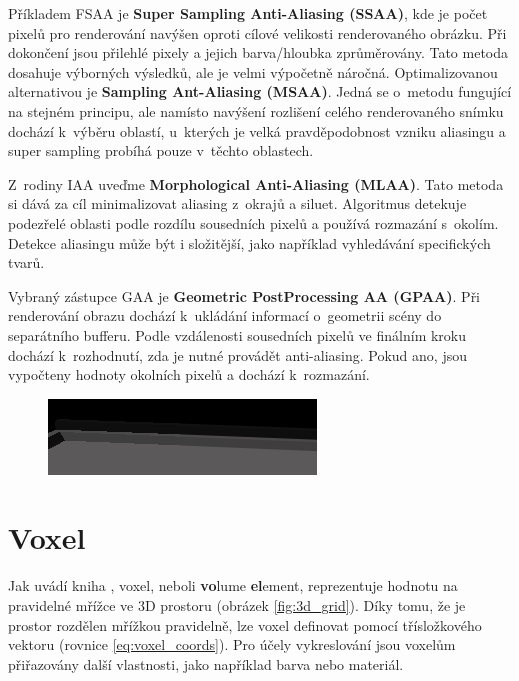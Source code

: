 Příkladem FSAA je \textbf{Super Sampling Anti-Aliasing (SSAA)}, kde je počet pixelů pro renderování navýšen oproti cílové velikosti renderovaného obrázku. Při dokončení jsou přilehlé pixely a jejich barva/hloubka zprůměrovány. Tato metoda dosahuje výborných výsledků, ale je velmi výpočetně náročná. Optimalizovanou alternativou je \textbf{Sampling Ant-Aliasing (MSAA)}. Jedná se o~metodu fungující na stejném principu, ale namísto navýšení rozlišení celého renderovaného snímku dochází k~výběru oblastí, u~kterých je velká pravděpodobnost vzniku aliasingu a super sampling probíhá pouze v~těchto oblastech.

Z~rodiny IAA uveďme\textbf{ Morphological Anti-Aliasing (MLAA)}. Tato metoda si dává za cíl minimalizovat aliasing z~okrajů a siluet. Algoritmus detekuje podezřelé oblasti podle rozdílu sousedních pixelů a používá rozmazání s~okolím. Detekce aliasingu může být i složitější, jako například vyhledávání specifických tvarů.


Vybraný zástupce GAA je \textbf{Geometric PostProcessing AA (GPAA)}. Při renderování obrazu dochází k~ukládání informací o~geometrii scény do separátního bufferu. Podle vzdálenosti sousedních pixelů ve finálním kroku dochází k~rozhodnutí, zda je nutné provádět anti-aliasing. Pokud ano, jsou vypočteny hodnoty okolních pixelů a dochází k~rozmazání.

\begin{figure}[H]
	\centering
	\includegraphics[scale=3]{obrazky-figures/ssaa_diff.png}
	\captionsetup{justification=centering}
	\label{fig:aliasing_ssaa}
\end{figure}




\section{Voxel} \label{voxels}
Jak uvádí kniha \cite{gfx_principles_practice}, voxel, neboli \textbf{vo}lume \textbf{el}ement, reprezentuje hodnotu na pravidelné mřížce ve 3D prostoru (obrázek \ref{fig:3d_grid}). Díky tomu, že je prostor rozdělen mřížkou pravidelně, lze voxel definovat pomocí třísložkového vektoru (rovnice \ref{eq:voxel_coords}). Pro účely vykreslování jsou voxelům přiřazovány další vlastnosti, jako například barva nebo materiál.

